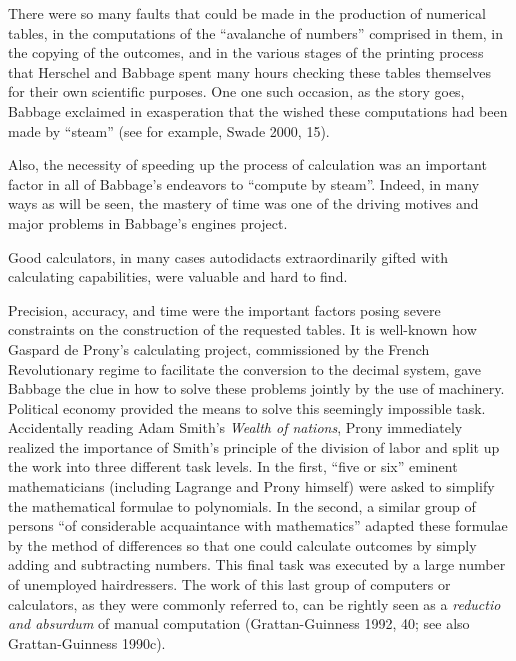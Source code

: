 \documentclass[version=last,draft=true,paper=A4,portrait,twoside=true,twocolumn=false,headinclude=false,footinclude=false,fontsize=12,BCOR=20mm,DIV=calc,pagesize=auto,titlepage=firstiscover,mpinclude=true,open=right,chapterprefix=true,numbers=autoendperiod,headsepline=false,headings=twolinechapter,parskip=false]{scrbook}
\begin{document}
There were so many faults that could be made in the production of numerical
tables, in the computations of the ``avalanche of numbers'' comprised in
them, in the copying of the outcomes, and in the various stages of the
printing process that Herschel and Babbage spent many hours checking these
tables themselves for their own scientific purposes. One one such occasion,
as the story goes, Babbage exclaimed in exasperation that the wished these
computations had been made by ``steam'' (see for example, Swade 2000, 15).

Also, the necessity of speeding up the process of calculation was an
important factor in all of Babbage's endeavors to ``compute by steam''.
Indeed, in many ways as will be seen, the mastery of time was one of the
driving motives and major problems in Babbage's engines project. 

Good calculators, in many cases autodidacts extraordinarily gifted with
calculating capabilities, were valuable and hard to find. 

Precision, accuracy, and time were the important factors posing severe
constraints on the construction of the requested tables. It is well-known
how Gaspard de Prony's calculating project, commissioned by the French
Revolutionary regime to facilitate the conversion to the decimal system,
gave Babbage the clue in how to solve these problems jointly by the use of
machinery. Political economy provided the means to solve this seemingly
impossible task. Accidentally reading Adam Smith's \emph{Wealth of nations}, Prony
immediately realized the importance of Smith's principle of the division of
labor and split up the work into three different task levels. In the first,
``five or six'' eminent mathematicians (including Lagrange and Prony
himself) were asked to simplify the mathematical formulae to polynomials.
In the second, a similar group of persons ``of considerable acquaintance
with mathematics'' adapted these formulae by the method of differences so
that one could calculate outcomes by simply adding  and subtracting
numbers. This final task was executed by a large number of unemployed
hairdressers. The work of this last group of computers or calculators, as
they were commonly referred to, can be rightly seen as a \emph{reductio and
absurdum} of manual computation (Grattan-Guinness 1992, 40; see also
Grattan-Guinness 1990c). 
\end{document}
